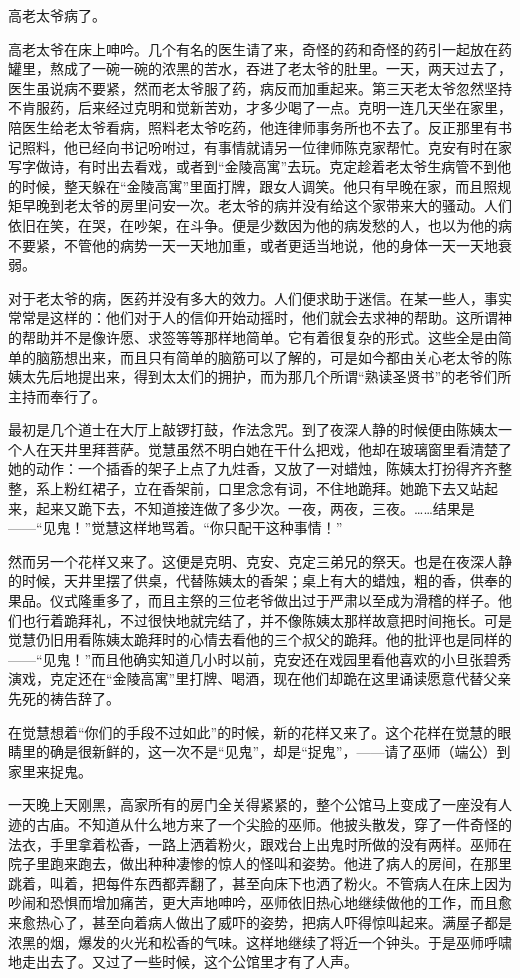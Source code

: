 \par 高老太爷病了。
\par 高老太爷在床上呻吟。几个有名的医生请了来，奇怪的药和奇怪的药引一起放在药罐里，熬成了一碗一碗的浓黑的苦水，吞进了老太爷的肚里。一天，两天过去了，医生虽说病不要紧，然而老太爷服了药，病反而加重起来。第三天老太爷忽然坚持不肯服药，后来经过克明和觉新苦劝，才多少喝了一点。克明一连几天坐在家里，陪医生给老太爷看病，照料老太爷吃药，他连律师事务所也不去了。反正那里有书记照料，他已经向书记吩咐过，有事情就请另一位律师陈克家帮忙。克安有时在家写字做诗，有时出去看戏，或者到“金陵高寓”去玩。克定趁着老太爷生病管不到他的时候，整天躲在“金陵高寓”里面打牌，跟女人调笑。他只有早晚在家，而且照规矩早晚到老太爷的房里问安一次。老太爷的病并没有给这个家带来大的骚动。人们依旧在笑，在哭，在吵架，在斗争。便是少数因为他的病发愁的人，也以为他的病不要紧，不管他的病势一天一天地加重，或者更适当地说，他的身体一天一天地衰弱。
\par 对于老太爷的病，医药并没有多大的效力。人们便求助于迷信。在某一些人，事实常常是这样的：他们对于人的信仰开始动摇时，他们就会去求神的帮助。这所谓神的帮助并不是像许愿、求签等等那样地简单。它有着很复杂的形式。这些全是由简单的脑筋想出来，而且只有简单的脑筋可以了解的，可是如今都由关心老太爷的陈姨太先后地提出来，得到太太们的拥护，而为那几个所谓“熟读圣贤书”的老爷们所主持而奉行了。
\par 最初是几个道士在大厅上敲锣打鼓，作法念咒。到了夜深人静的时候便由陈姨太一个人在天井里拜菩萨。觉慧虽然不明白她在干什么把戏，他却在玻璃窗里看清楚了她的动作：一个插香的架子上点了九炷香，又放了一对蜡烛，陈姨太打扮得齐齐整整，系上粉红裙子，立在香架前，口里念念有词，不住地跪拜。她跪下去又站起来，起来又跪下去，不知道接连做了多少次。一夜，两夜，三夜。……结果是——“见鬼！”觉慧这样地骂着。“你只配干这种事情！”
\par 然而另一个花样又来了。这便是克明、克安、克定三弟兄的祭天。也是在夜深人静的时候，天井里摆了供桌，代替陈姨太的香架；桌上有大的蜡烛，粗的香，供奉的果品。仪式隆重多了，而且主祭的三位老爷做出过于严肃以至成为滑稽的样子。他们也行着跪拜礼，不过很快地就完结了，并不像陈姨太那样故意把时间拖长。可是觉慧仍旧用看陈姨太跪拜时的心情去看他的三个叔父的跪拜。他的批评也是同样的——“见鬼！”而且他确实知道几小时以前，克安还在戏园里看他喜欢的小旦张碧秀演戏，克定还在“金陵高寓”里打牌、喝酒，现在他们却跪在这里诵读愿意代替父亲先死的祷告辞了。
\par 在觉慧想着“你们的手段不过如此”的时候，新的花样又来了。这个花样在觉慧的眼睛里的确是很新鲜的，这一次不是“见鬼”，却是“捉鬼”，——请了巫师（端公）到家里来捉鬼。
\par 一天晚上天刚黑，高家所有的房门全关得紧紧的，整个公馆马上变成了一座没有人迹的古庙。不知道从什么地方来了一个尖脸的巫师。他披头散发，穿了一件奇怪的法衣，手里拿着松香，一路上洒着粉火，跟戏台上出鬼时所做的没有两样。巫师在院子里跑来跑去，做出种种凄惨的惊人的怪叫和姿势。他进了病人的房间，在那里跳着，叫着，把每件东西都弄翻了，甚至向床下也洒了粉火。不管病人在床上因为吵闹和恐惧而增加痛苦，更大声地呻吟，巫师依旧热心地继续做他的工作，而且愈来愈热心了，甚至向着病人做出了威吓的姿势，把病人吓得惊叫起来。满屋子都是浓黑的烟，爆发的火光和松香的气味。这样地继续了将近一个钟头。于是巫师呼啸地走出去了。又过了一些时候，这个公馆里才有了人声。
